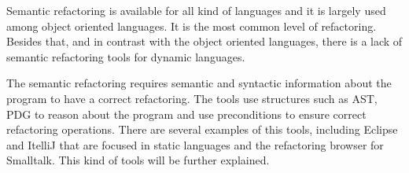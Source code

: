 Semantic refactoring is available for all kind of languages and it is largely used among object oriented languages.
It is the most common level of refactoring.
Besides that, and in contrast with the object oriented languages, there is a lack of semantic refactoring tools for dynamic languages.

The semantic refactoring requires semantic and syntactic information about the program to have a correct refactoring.
The tools use structures such as AST, PDG to reason about the program and use preconditions to ensure correct refactoring operations.
There are several examples of this tools, including Eclipse and ItelliJ that are focused in static languages and the refactoring browser for Smalltalk.
This kind of tools will be further explained. 